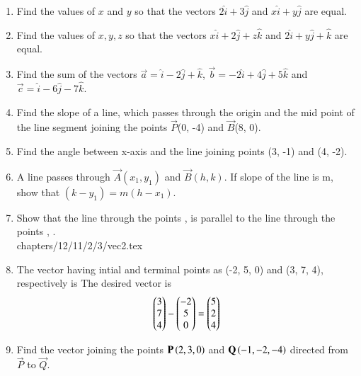 \begin{enumerate}[label=\thesubsection.\arabic*, ref=\thesubsection.\theenumi]
	\item 		Find the values of $x$ and $y$ so that the vectors
$2\hat{i}+3\hat{j}$
and 
$x\hat{i}+y\hat{j}$
are equal.
\\
\solution

\item Find the values of $x, y, z$ so that the vectors 
$x\hat{i}+2\hat{j}+z\hat{k}$
and 
$2\hat{i}+y\hat{j}+\hat{k}$
are equal.
\item Find the sum of the vectors $\vec{a}=\hat{i}-2\hat{j}+\hat{k}$,  $\vec{b}=-2\hat{i}+4\hat{j}+5\hat{k}$ and $\vec{c}=\hat{i}-6\hat{j}-7\hat{k}$.
\item Find the slope of a line,  which passes through the origin and the mid point of the line segment joining the points $\vec{P}$(0, -4) and $\vec{B}$(8, 0).
\label{chapters/11/10/1/5}
	\\
	\solution

\item Find the angle between x-axis and the line joining points (3, -1) and (4, -2).
\label{chapters/11/10/1/10}
\\
\solution 

\item A line passes through $\vec{A}(x_1, y_1)$ and $\vec{B}(h, k)$. If slope of the line is m,  show that $(k-y_1)=m(h-x_1)$.
\label{chapters/11/10/1/12}
\\
\solution 

\item
Show that the line through the points ,  is parallel to the line through the points , .
	\label{12.11.2.3}
\\
\solution
	 {chapters/12/11/2/3/vec2.tex}
\item The vector having intial and terminal points as (-2, 5, 0) and (3, 7, 4), respectively is
\solution
The desired vector is
\begin{align}
	\begin{pmatrix}3 \\ 7 \\ 4\end{pmatrix}
	-\begin{pmatrix}-2 \\ 5 \\ 0\end{pmatrix} = 
	\begin{pmatrix}5 \\ 2 \\ 4\end{pmatrix}  
\end{align}
\item Find the vector joining the points $\mathbf{P}\left(2, 3, 0\right)$ and $\mathbf{Q}\left(-1, -2, -4\right)$ directed from $\vec{P}$ to $\vec{Q}$.

\end{enumerate}
